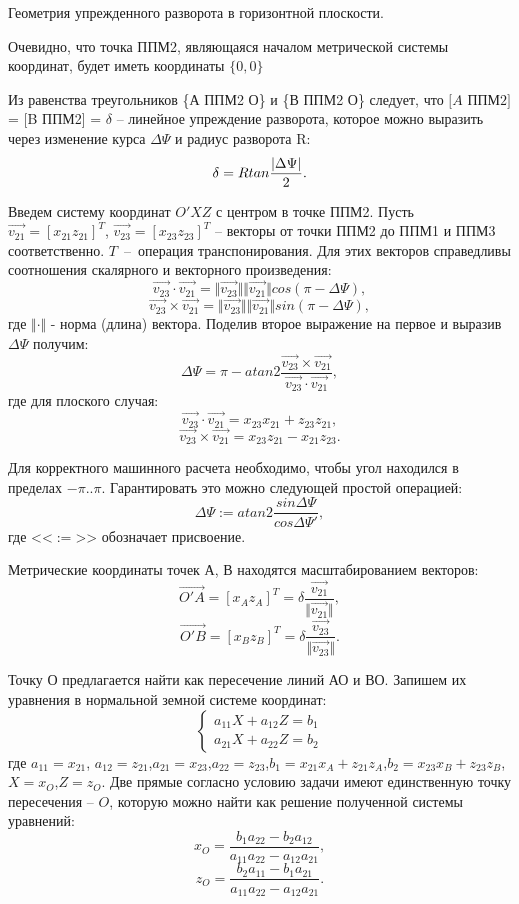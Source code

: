 
\begin{center}
    Геометрия упрежденного разворота в горизонтной плоскости.
\end{center}

Очевидно, что точка ППМ2, являющаяся началом метрической системы координат, будет иметь координаты $\{0,0\}$

Из равенства треугольников \{А ППМ2 О\} и \{В ППМ2 О\} следует, что \linebreak 
$[A$ $\text{ППМ}2]$ = [B ППМ2] = $\delta$ – линейное 
упреждение разворота, которое можно выразить через изменение курса $\Delta  \Psi$ и радиус разворота R:
$$\delta=R \space tan \frac{|\Delta \Psi|}{2}.$$

Введем систему координат $O'XZ$ с центром в точке ППМ2. Пусть $\overrightarrow{v_{21}}=[x_{21}  z_{21} ]^T$, 
$\overrightarrow{v_{23}}=[x_{23}  z_{23} ]^T$ – векторы от точки ППМ2 до ППМ1 и ППМ3 соответственно. $T$~–~операция транспонирования. 
Для этих векторов справедливы соотношения скалярного и векторного произведения:
$$\overrightarrow{v_{23}} \cdot \overrightarrow{v_{21}}=\Vert \overrightarrow{v_{23}}\Vert\Vert\overrightarrow{v_{21}} \Vert cos(\pi-\Delta \Psi),$$
$$\overrightarrow{v_{23}}  \times  \overrightarrow{v_{21}}=\Vert\overrightarrow{v_{23}} \Vert\Vert\overrightarrow{v_{21}} \Vert sin(\pi -\Delta \Psi),$$
где $\Vert \cdot \Vert$ - норма (длина) вектора. Поделив второе выражение на первое и выразив $\Delta \Psi$ получим:
$$\Delta \Psi = \pi - atan2 \frac{\overrightarrow{v_{23}} \times \overrightarrow{v_{21}}}{\overrightarrow{v_{23}} \cdot \overrightarrow{v_{21}}},$$
где для плоского случая:
$$ \overrightarrow{v_{23}} \cdot \overrightarrow{v_{21}}=x_{23} x_{21}+z_{23} z_{21},$$
$$ \overrightarrow{v_{23}} \times \overrightarrow{v_{21}}=x_{23} z_{21}-x_{21} z_{23}.$$

Для корректного машинного расчета необходимо, чтобы угол находился в пределах $-\pi..\pi$. Гарантировать это 
можно следующей простой операцией:
$$ \Delta \Psi := atan2 \frac{sin\Delta \Psi}{cos\Delta \Psi '},$$
где <<$:=$>> обозначает присвоение.

Метрические координаты точек А, В находятся масштабированием векторов:
$$\overrightarrow {O' A}= [x_A z_A ]^T=\delta \frac{\overrightarrow{v_{21}}}{\Vert\overrightarrow{v_{21}} \Vert} ,$$
$$\overrightarrow{O' B}=[x_B z_B ]^T=\delta \frac{\overrightarrow{v_{23}}}{\Vert\overrightarrow{v_{23}} \Vert} .$$

Точку О предлагается найти как пересечение линий АО и ВО. Запишем их уравнения в нормальной земной 
системе координат:
$$\left\{ \begin{array}{l}
    a_{11} X+a_{12} Z=b_1\\
    a_{21} X+a_{22} Z=b_2
    \end{array}
    \right.
$$
где $a_{11}=x_{21}$, $a_{12}=z_{21}$,$a_{21}=x_{23}$,$a_{22}=z_{23}$,$b_1=x_{21} x_A+z_21 z_A$,$b_2=x_{23} x_B+z_{23} z_B$,
$X=x_O$,$Z=z_O$. Две прямые согласно условию задачи имеют единственную точку пересечения – $O$, которую можно 
найти как решение полученной системы уравнений:
$$x_O=\frac{b_1 a_{22}-b_2 a_{12}}{a_{11} a_{22}-a_{12} a_{21}},$$
$$z_O=\frac{b_2 a_{11}-b_1 a_{21}}{a_{11} a_{22}-a_{12} a_{21}}.$$

